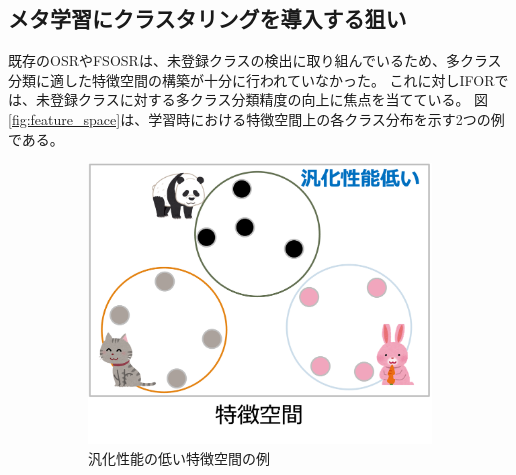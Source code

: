 \documentclass[a4paper,11pt,nomag]{jsreport}
\begin{document}
\subsection{メタ学習にクラスタリングを導入する狙い}
既存のOSRやFSOSRは、未登録クラスの検出に取り組んでいるため、多クラス分類に適した特徴空間の構築が十分に行われていなかった。
これに対しIFORでは、未登録クラスに対する多クラス分類精度の向上に焦点を当てている。
図 \ref{fig:feature_space}は、学習時における特徴空間上の各クラス分布を示す2つの例である。
% 
\begin{figure}[tbp]
  \centering
  \begin{subfigure}[b]{0.45\linewidth}
    \centering
    \includegraphics[height=0.9\linewidth, keepaspectratio]{image/bad_featurespace.png}
    \caption{汎化性能の低い特徴空間の例}
    \label{fig:bad_featurespace}
  \end{subfigure}
  \hfill
  \begin{subfigure}[b]{0.45\linewidth}
    \centering

\end{subfigure}
\end{figure}
\end{document}
